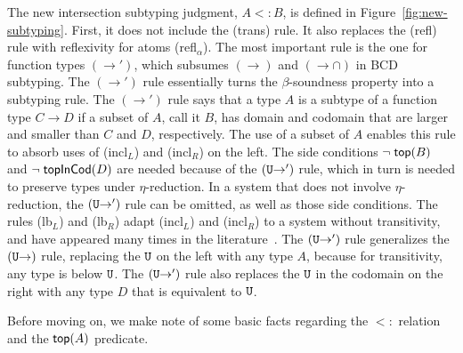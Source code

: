 \documentclass{article}
\begin{document}
The new intersection subtyping judgment, $A <: B$, is defined in
Figure~\ref{fig:new-subtyping}. First, it does not include the (trans)
rule.  It also replaces the (refl) rule with reflexivity for atoms
(refl$_\alpha$). The most important rule is the one for function types
$(\to')$, which subsumes $(\to)$ and $({\to}{\cap})$ in BCD subtyping.  The
$(\to')$ rule essentially turns the $\beta$-soundness property into a
subtyping rule. The $(\to')$ rule says that a type $A$ is a subtype of a
function type $C \to D$ if a subset of $A$, call it $B$, has domain and
codomain that are larger and smaller than $C$ and $D$,
respectively. The use of a subset of $A$ enables this rule to absorb
uses of (incl$_L$) and (incl$_R$) on the left.  The side conditions
$\neg\;\mathsf{top}(B)$ and $\neg\;\mathsf{topInCod}(D)$ are needed because of the
$(\mathtt{U}{\to}')$ rule, which in turn is needed to preserve types under
$\eta$-reduction.  In a system that does not involve $\eta$-reduction,
the $(\mathtt{U}{\to}')$ rule can be omitted, as well as those side
conditions. The rules (lb$_L$) and (lb$_R$) adapt (incl$_L$) and
(incl$_R$) to a system without transitivity, and have appeared many
times in the literature~\citep{Bakel:1995aa}.  The $(\mathtt{U}{\to}')$ rule
generalizes the $(\mathtt{U}{\to})$ rule, replacing the $\mathtt{U}$ on the left with
any type $A$, because for transitivity, any type is below $\mathtt{U}$. The
$(\mathtt{U}{\to}')$ rule also replaces the $\mathtt{U}$ in the codomain on the
right with any type $D$ that is equivalent to $\mathtt{U}$.

Before moving on, we make note of some basic facts regarding the $<:$
relation and the $\mathsf{top}(A)$ predicate.
\end{document}
